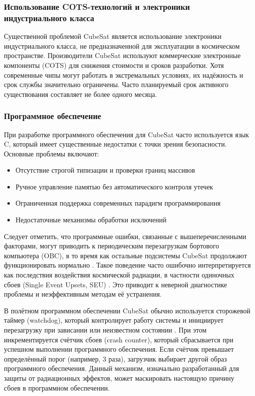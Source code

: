 \subsubsection{Использование COTS-технологий и электроники индустриального класса}
Существенной проблемой CubeSat является использование электроники индустриального класса, не предназначенной для эксплуатации в космическом пространстве\cite{scholz2015cots}. Производители CubeSat используют коммерческие электронные компоненты (COTS) для снижения стоимости и сроков разработки. Хотя современные чипы могут работать в экстремальных условиях, их надёжность и срок службы значительно ограничены. Часто планируемый срок активного существования составляет не более одного месяца\cite{scholz2015cots}.

\subsubsection{Программное обеспечение}
При разработке программного обеспечения для CubeSat часто используется язык C, который имеет существенные недостатки с точки зрения безопасности. Основные проблемы включают:

\begin{itemize}
	\item Отсутствие строгой типизации и проверки границ массивов
	\item Ручное управление памятью без автоматического контроля утечек
	\item Ограниченная поддержка современных парадигм программирования
	\item Недостаточные механизмы обработки исключений
\end{itemize}

Следует отметить, что программные ошибки, связанные с вышеперечисленными факторами, могут приводить к периодическим перезагрузкам бортового компьютера (OBC), в то время как остальные подсистемы CubeSat продолжают функционировать нормально \cite{langer2009reliability}. Такое поведение часто ошибочно интерпретируется как последствия воздействия космической радиации, в частности одиночных сбоев (Single Event Upsets, SEU) \cite{koopman2020edge}. Это приводит к неверной диагностике проблемы и неэффективным методам её устранения.

В полётном программном обеспечении CubeSat обычно используется сторожевой таймер (watchdog), который контролирует работу системы и инициирует перезагрузку при зависании или неизвестном состоянии \cite{kastensmidt2019fault}. При этом инкрементируется счётчик сбоев (crash counter), который сбрасывается при успешном выполнении программного обеспечения. Если счётчик превышает определённый порог (например, 3 раза), загрузчик выбирает другой образ программного обеспечения. Данный механизм, изначально разработанный для защиты от радиационных эффектов, может маскировать настоящую причину сбоев в программном обеспечении.

